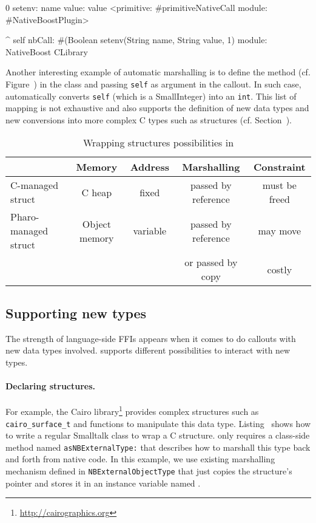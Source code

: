 \begin{stcode}[
	label={lst:setenv},
	caption={Example of callout to \ttt{setenv}}]{0}
setenv: name value: value
	<primitive: #primitiveNativeCall
	 module: #NativeBoostPlugin>

	^ self
		nbCall: #(Boolean setenv(String name,
								 String value,
								 1)
		module: NativeBoost CLibrary
\end{stcode}

Another interesting example of automatic marshalling is to define the  method (cf. Figure~) in the  class and passing \texttt{self} as argument in the callout. In such case, \NB automatically converts \texttt{self} (which is a SmallInteger) into an \texttt{int}.
This list of mapping is not exhaustive and \NB also supports the definition of new data types and new conversions into more complex C types such as structures (cf. Section~).



\begin{table*}[t]
    \centering
    \begin{tabular}{lcccc}
                    &  Memory 	& Address & Marshalling & Constraint  \\\midrule
C-managed struct 	&  C heap  	& fixed & passed by reference & must be freed \\
Pharo-managed struct & Object memory & variable & passed by reference & may move \\
& & & or passed by copy & costly\\
    \end{tabular}
    \caption{Wrapping structures possibilities in \NB}
\end{table*}

\subsection{Supporting new types}

The strength of language-side FFIs appears when it comes to do callouts with new data types involved.
\NBFFI supports different possibilities to interact with new types.

\paragraph{Declaring structures.}
For example, the Cairo library\footnote{\url{http://cairographics.org}} provides complex structures such as \texttt{cairo\_surface\_t} and functions to manipulate this data type. %
Listing~ shows how to write a regular Smalltalk class to wrap a C structure.
\NB only requires a class-side method named \texttt{asNBExternalType:} that describes how to marshall this type back and forth from native code.
In this example, we use existing marshalling mechanism defined in \texttt{NBExternalObjectType} that just copies the structure's pointer and stores it in an instance variable named .


